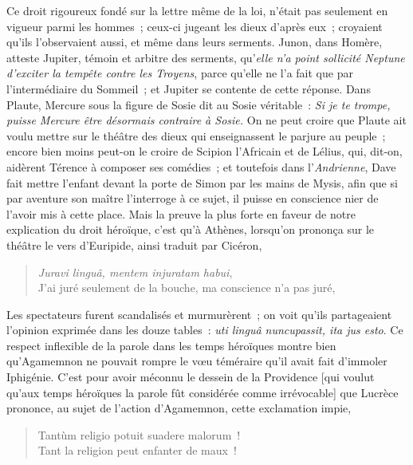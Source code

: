\documentclass[french,twoside]{book} %
\begin{document}
Ce droit rigoureux fondé sur la lettre même de la loi, n’était pas seulement en vigueur parmi les hommes ; ceux-ci jugeant les dieux d’après eux ; croyaient qu’ils l’observaient aussi, et même dans leurs serments. Junon, dans Homère, atteste Jupiter, témoin et arbitre des serments, qu’\emph{{\itshape elle n’a point sollicité Neptune d’exciter la tempête contre les Troyens}}, parce qu’elle ne l’a fait que par l’intermédiaire du Sommeil ; et Jupiter se contente de cette réponse. Dans Plaute, Mercure sous la figure de Sosie dit au Sosie véritable : \emph{{\itshape Si je te trompe, puisse Mercure être désormais contraire à Sosie.}} On ne peut croire que Plaute ait voulu mettre sur le théâtre des dieux qui enseignassent le parjure au peuple ; encore bien moins peut-on le croire de Scipion l’Africain et de Lélius, qui, dit-on, aidèrent Térence à composer  ses comédies ; et toutefois dans l’{\itshape Andrienne}, Dave fait mettre l’enfant devant la porte de Simon par les mains de Mysis, afin que si par aventure son maître l’interroge à ce sujet, il puisse en conscience nier de l’avoir mis à cette place. Mais la preuve la plus forte en faveur de notre explication du droit héroïque, c’est qu’à Athènes, lorsqu’on prononça sur le théâtre le vers d’Euripide, ainsi traduit par Cicéron,\par


\begin{verse}
{\itshape Juravi linguâ, mentem injuratam habui},\\
J’ai juré seulement de la bouche, ma conscience n’a pas juré,\\
\end{verse}

\noindent Les spectateurs furent scandalisés et murmurèrent ; on voit qu’ils partageaient l’opinion exprimée dans les douze tables : \emph{{\itshape uti linguâ nuncupassit, ita jus esto}}. Ce respect inflexible de la parole dans les temps héroïques montre bien qu’Agamemnon ne pouvait rompre le vœu téméraire qu’il avait fait d’immoler Iphigénie. C’est pour avoir méconnu le dessein de la Providence [qui voulut qu’aux temps héroïques la parole fût considérée comme irrévocable] que Lucrèce prononce, au sujet de l’action d’Agamemnon, cette exclamation impie,\par


\begin{verse}
Tantùm religio potuit suadere malorum !\\
Tant la religion peut enfanter de maux !\\
\end{verse}
\end{document}
